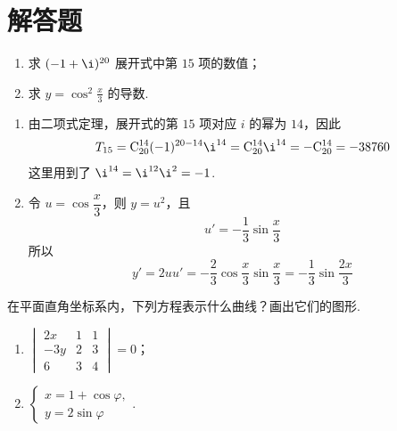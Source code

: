 \section{解答题}

\begin{problem}

\begin{enumerate}
\item 求 \((-1+\i)^{20}\) 展开式中第 \(15\) 项的数值；
\item 求 \(y=\cos^2 \frac{x}{3}\) 的导数.
\end{enumerate}
\end{problem}

\begin{solution}
\begin{enumerate}
\item 由二项式定理，展开式的第 \(15\) 项对应 \(i\) 的幂为 \(14\)，因此
\[
T_{15}=\mathrm C_{20}^{14}(-1)^{20-14}\i^{14}=\mathrm C_{20}^{14}\i^{14}=-\mathrm C_{20}^{14}=-38760
\]
这里用到了 \(\i^{14}=\i^{12}\i^2=-1\).
\item 令 \(u=\cos\dfrac{x}{3}\)，则 \(y=u^2\)，且
\[
u'=-\dfrac{1}{3}\sin\dfrac{x}{3}
\]
所以
\[
y'=2u u'=-\dfrac{2}{3}\cos\dfrac{x}{3}\sin\dfrac{x}{3}=-\dfrac{1}{3}\sin\dfrac{2x}{3}
\]
\end{enumerate}
\end{solution}

\begin{problem}

在平面直角坐标系内，下列方程表示什么曲线？画出它们的图形.

\begin{enumerate}
\item \(\begin{vmatrix} 2x & 1 & 1 \\ -3y & 2 & 3 \\ 6 & 3 & 4 \end{vmatrix}=0\)；
\item \(\begin{cases}
x=1+\cos \varphi,\\
y=2\sin \varphi
\end{cases}\).
\end{enumerate}
\end{problem}

